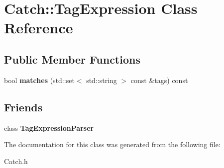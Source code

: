 \hypertarget{class_catch_1_1_tag_expression}{\section{Catch\-:\-:Tag\-Expression Class Reference}
\label{class_catch_1_1_tag_expression}
}
\subsection*{Public Member Functions}
\begin{DoxyCompactItemize}
\item 
\hypertarget{class_catch_1_1_tag_expression_a723a46b4d0fd6c06a293b6f7ce116f71}{bool {\bfseries matches} (std\-::set$<$ std\-::string $>$ const \&tags) const }\label{class_catch_1_1_tag_expression_a723a46b4d0fd6c06a293b6f7ce116f71}

\end{DoxyCompactItemize}
\subsection*{Friends}
\begin{DoxyCompactItemize}
\item 
\hypertarget{class_catch_1_1_tag_expression_a73ab9a7179a1b439fb9a97d1fa322e7a}{class {\bfseries Tag\-Expression\-Parser}}\label{class_catch_1_1_tag_expression_a73ab9a7179a1b439fb9a97d1fa322e7a}

\end{DoxyCompactItemize}


The documentation for this class was generated from the following file\-:\begin{DoxyCompactItemize}
\item 
Catch.\-h\end{DoxyCompactItemize}
